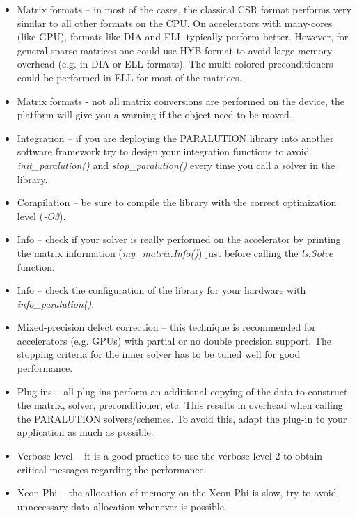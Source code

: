 \begin{itemize}
\item Matrix formats -- in most of the cases, the classical CSR format performs very similar to all other formats on the CPU. On accelerators with many-cores (like GPU), formats like DIA and ELL typically perform better. However, for general sparse matrices one could use HYB format to avoid large memory overhead (e.g. in DIA or ELL formats). The multi-colored preconditioners could be performed in ELL for most of the matrices.

\item Matrix formats - not all matrix conversions are performed on the device, the platform will give you a warning if the object need to be moved.

\item Integration -- if you are deploying the PARALUTION library into another software framework try to design your integration functions to avoid \emph{init\_paralution()} and \emph{stop\_paralution()} every time you call a solver in the library. 

\item Compilation -- be sure to compile the library with the correct optimization level (\emph{-O3}).

\item Info -- check if your solver is really performed on the accelerator by printing the matrix information (\emph{my\_matrix.Info()}) just before calling the \emph{ls.Solve} function.

\item Info -- check the configuration of the library for your hardware with \emph{info\_paralution()}.

\item Mixed-precision defect correction -- this technique is recommended for accelerators (e.g. GPUs) with partial or no double precision support. The stopping criteria for the inner solver has to be tuned well for good performance. 

\item Plug-ins -- all plug-ins perform an additional copying of the data to construct the matrix, solver, preconditioner, etc. This results in overhead when calling the PARALUTION solvers/schemes. To avoid this, adapt the plug-in to your application as much as possible.

\item Verbose level -- it is a good practice to use the verbose level 2 to obtain critical messages regarding the performance.

\item Xeon Phi -- the allocation of memory on the Xeon Phi is slow, try to avoid unnecessary data allocation whenever is possible.

\end{itemize}

